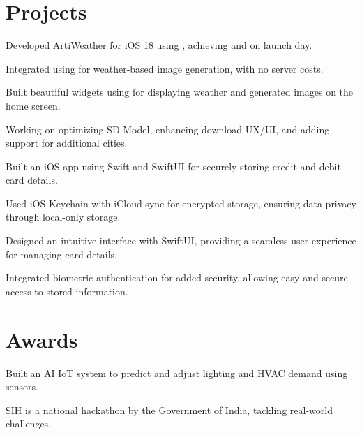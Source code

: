 \documentclass{fonts}
\begin{document}

\section{Projects}

\textbf{\href{https://apps.apple.com/app/artiweather/id6446815662}{}} 
\begin{tightemize}
    \item Developed ArtiWeather for iOS 18 using , achieving  and  on launch day.
    \item Integrated  using  for weather-based image generation, with no server costs.
    \item Built beautiful widgets using  for displaying weather and generated images on the home screen.
    \item Working on optimizing SD Model, enhancing download UX/UI, and adding support for additional cities.
\end{tightemize}
\sectionsep

\textbf{\href{https://github.com/swiftlysingh/Holder}{}} 
\begin{tightemize}
    \item Built an iOS app using Swift and SwiftUI for securely storing credit and debit card details.
    \item Used iOS Keychain with iCloud sync for encrypted storage, ensuring data privacy through local-only storage.
    \item Designed an intuitive interface with SwiftUI, providing a seamless user experience for managing card details.
    \item Integrated biometric authentication for added security, allowing easy and secure access to stored information.
\end{tightemize}


\section{Awards} 
\textbf{}
\begin{tightemize}
    \item Built an AI IoT system to predict and adjust lighting and HVAC demand using sensors.
    \item SIH is a national hackathon by the Government of India, tackling real-world challenges.
\end{tightemize}
\sectionsep
\end{document}
